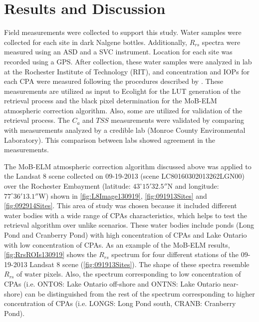 \documentclass[onecolumn,3p,letterpaper]{elsarticle}
\begin{document}
\section{Results and Discussion}
\label{sec:Results}
Field measurements were collected to support this study. Water samples were collected for each site in dark Nalgene bottles. Additionally, $R_{rs}$ spectra were measured using an ASD and a SVC instrument. Location for each site was recorded using a GPS. After collection, these water samples were analyzed in lab at the Rochester Institute of Technology (RIT), and concentration and IOPs for each CPA were measured following the procedures described by \cite{Mueller1995}. These measurements are utilized as input to Ecolight for the LUT generation of the retrieval process and the black pixel determination for the MoB-ELM atmospheric correction algorithm. Also, some are utilized for validation of the retrieval process. The $C_a$ and $TSS$ measurements were validated by comparing with measurements analyzed by a credible lab (Monroe County Environmental Laboratory). This comparison between labs showed agreement in the measurements.

The MoB-ELM atmospheric correction algorithm discussed above was applied to the Landsat 8 scene collected on 09-19-2013 (scene LC80160302013262LGN00) over the Rochester Embayment (latitude: $43^\circ15'32.5''$N and longitude: $77^\circ36'13.1''$W) shown in \autoref{fig:L8Image130919}, \autoref{fig:091913Sites} and \autoref{fig:092914Sites}. This area of study was chosen because it included different water bodies with a wide range of CPAs characteristics, which helps to test the retrieval algorithm over unlike scenarios. These water bodies include ponds (Long Pond and Cranberry Pond) with high concentration of CPAs and Lake Ontario with low concentration of CPAs. As an example of the MoB-ELM results, \autoref{fig:RrsROIs130919} shows the $R_{rs}$ spectrum for four different stations of the 09-19-2013 Landsat 8 scene (\autoref{fig:091913Sites}). The shape of these spectra resemble $R_{rs}$ of water pixels. Also, the spectrum corresponding to low concentration of CPAs (i.e. ONTOS: Lake Ontario off-shore and ONTNS: Lake Ontario near-shore) can be distinguished from the rest of the spectrum corresponding to higher concentration of CPAs (i.e. LONGS: Long Pond south, CRANB: Cranberry Pond).
\end{document}
